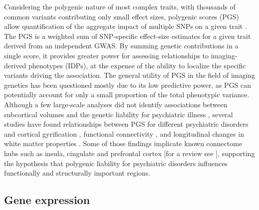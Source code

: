 Considering the polygenic nature of most complex traits, with thousands of common variants contributing only small effect sizes, polygenic scores (PGS) allow quantification of the aggregate impact of multiple SNPs on a given trait \citep{Dudbridge2013}. The PGS is a weighted sum of SNP-specific effect-size estimates for a given trait derived from an independent GWAS. By summing genetic contributions in a single score, it provides greater power for assessing relationships to imaging-derived phenotypes (IDPs), at the expense of the ability to localize the specific variants driving the association. The general utility of PGS in the field of imaging genetics has been questioned \citep{Papiol2014} mostly due to its low predictive power, as PGS can potentially account for only a small proportion of the total phenotypic variance. Although a few large-scale analyses did not identify associations between subcortical volumes and the genetic liability for psychiatric illness \citep{Franke2016,Reus2017}, several studies have found relationships between PGS for different psychiatric disorders and cortical gyrification \citep{Liu2016a}, functional connectivity \citep{Dezhina2018,Wang2017}, and longitudinal changes in white matter properties \mbox{\citep{Alloza2018}}. Some of those findings implicate known connectome hubs such as insula, cingulate and prefrontal cortex [for a review see \citet{Dezhina2018}], supporting the hypothesis that polygenic liability for psychiatric disorders influences functionally and structurally important regions.

\subsection{Gene expression}

